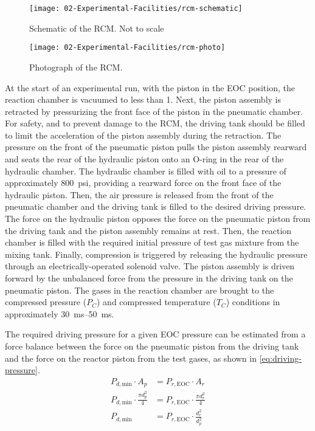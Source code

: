 \documentclass[../main.tex]{subfiles}
\begin{document}
\begin{sidewaysfigure}
\texttt{[image: 02-Experimental-Facilities/rcm-schematic]}
\caption{Schematic of the RCM. Not to scale}
\label{fig:rcm-schematic}
\end{sidewaysfigure}

\begin{figure}
\texttt{[image: 02-Experimental-Facilities/rcm-photo]}
\caption{Photograph of the RCM.}\label{fig:rcm-photo}
\end{figure}

At the start of an experimental run, with the piston in the
EOC position, the reaction chamber is vacuumed to less
than \SI{1}{\torr}. Next, the piston assembly is retracted by pressurizing
the front face of the piston in the pneumatic chamber.
For safety, and to prevent damage to the RCM, the driving tank should
be filled to limit the acceleration of the piston assembly during the
retraction.
The pressure on the front of the pneumatic piston pulls the
piston assembly rearward and seats the rear of the
hydraulic piston onto an O-ring in the rear of the
hydraulic chamber. The hydraulic chamber is filled with oil to
a pressure of approximately \SI{800}{psi}, providing a rearward force on the
front face of the hydraulic piston. Then, the air pressure is released from
the front of the pneumatic chamber and the driving tank is filled to
the desired driving pressure. The
force on the hydraulic piston opposes the force on the pneumatic piston
from the driving tank and the piston assembly remains at rest. Then, the
reaction chamber is filled with the required initial pressure of test
gas mixture from the mixing tank. Finally, compression is triggered by
releasing the hydraulic pressure through an electrically-operated solenoid
valve. The piston assembly is driven forward by the unbalanced force from
the pressure in the driving tank on the pneumatic piston. The gases
in the reaction chamber are brought to the compressed pressure ($P_C$) and
compressed temperature ($T_C$) conditions in approximately
\SIrange{30}{50}{\milli\second}.

The required driving pressure for a given EOC pressure can be estimated
from a force balance between the force on the pneumatic piston from the
driving tank and the force on the reactor piston from the test gases,
as shown in \autoref{eq:driving-pressure}.
%
\begin{subequations}
\label{eq:piston-force}
\begin{align}
    P_{d,\text{min}} \cdot A_p &= P_{r,\text{EOC}} \cdot A_r \\
    P_{d,\text{min}} \cdot \frac{\pi d_p^2}{4} &= P_{r,\text{EOC}} \cdot \frac{\pi d_r^2}{4} \\
    P_{d,\text{min}} &= P_{r,\text{EOC}} \cdot \frac{d_r^2}{d_p^2} \label{eq:driving-pressure}
\end{align}
\end{subequations}
\end{document}

